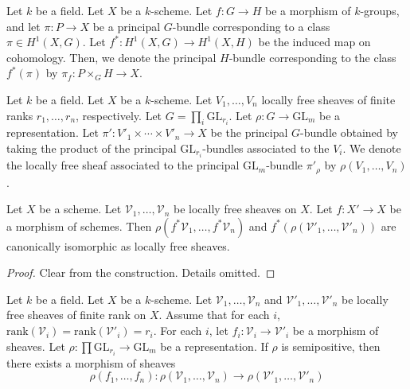 \begin{definition}
Let $k$ be a field.
Let $X$ be a $k$-scheme.
Let $f:G\to H$ be a morphism of $k$-groups, and let $\pi:P\to X$ be a principal
$G$-bundle corresponding to a class $\pi\in H^1(X,G)$.
Let $f^{*}:H^1(X,G)\to H^1(X,H)$ be the induced map on cohomology.
Then, we denote the principal $H$-bundle corresponding to the class
$f^{*}(\pi)$ by $\pi_f:P\times_{G}H\to X$.
\end{definition}

\begin{definition}
Let $k$ be a field.
Let $X$ be a $k$-scheme.
Let $V_1,\ldots,V_n$ locally free sheaves of finite ranks $r_1,\ldots,r_n$,
respectively.
Let $G = \prod_i \mathrm{GL}_{r_i}$.
Let $\rho : G \to \mathrm{GL}_m$ be a representation.
Let $\pi': V'_1 \times \cdots \times V'_n \to X$ be the principal $G$-bundle
obtained by taking the product of the principal $\mathrm{GL}_{r_i}$-bundles
associated to the $V_i$.
We denote the locally free sheaf associated to the principal
$\mathrm{GL}_m$-bundle $\pi'_\rho$ by $\rho(V_1,\ldots,V_n)$.
\end{definition}

\begin{lemma}\label{pullback_and_rho_commute}
Let $X$ be a scheme.
Let $\mathcal{V}_1,\ldots,\mathcal{V}_n$ be locally free sheaves on $X$.
Let $f: X' \to X$ be a morphism of schemes.
Then $\rho(f^*\mathcal{V}_1,\ldots,f^*\mathcal{V}_n)$ and
$f^*(\rho(\mathcal{V}'_1,\ldots,\mathcal{V}'_n))$ are canonically isomorphic as
locally free sheaves.
\end{lemma}

\begin{proof}
Clear from the construction. Details omitted.
\end{proof}


\begin{lemma}\label{functoriality_rho}
Let $k$ be a field.
Let $X$ be a $k$-scheme.
Let
$\mathcal{V}_1,\ldots,\mathcal{V}_n$
and
$\mathcal{V}'_1,\ldots,\mathcal{V}'_n$
be locally free sheaves of finite rank on $X$.
Assume that for each $i$,
$\mathrm{rank}(\mathcal{V}_i) = \mathrm{rank}(\mathcal{V}'_i) = r_i$.
For each $i$, let $f_i : \mathcal{V}_i \to \mathcal{V}'_i$ be a morphism
of sheaves.
Let $\rho : \prod \mathrm{GL}_{r_i} \to \mathrm{GL}_m$ be a representation.
If $\rho$ is semipositive, then there exists a morphism of sheaves
$$
  \rho(f_1,\dots, f_n) :
    \rho(\mathcal{V}_1,\ldots,\mathcal{V}_n) \to
    \rho(\mathcal{V}'_1,\dots,\mathcal{V}'_n)
$$
\end{lemma}

